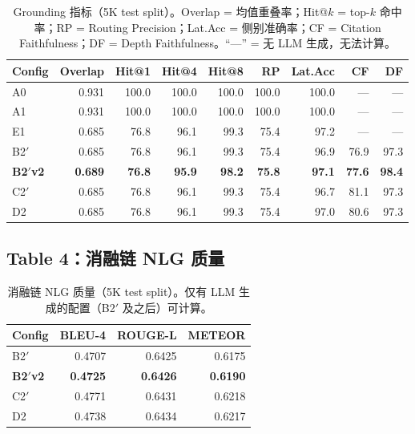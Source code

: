 \documentclass[11pt,a4paper]{article}
\theoremstyle{definition}
\begin{document}
\begin{table}[H]
\centering
\caption{Grounding 指标（5K test split）。Overlap = 均值重叠率；Hit@$k$ = top-$k$ 命中率；RP = Routing Precision；Lat.Acc = 侧别准确率；CF = Citation Faithfulness；DF = Depth Faithfulness。``---'' = 无 LLM 生成，无法计算。}\label{tab:grounding}
\small
\begin{tabular}{@{}l r r r r r r r r@{}}
\toprule
\textbf{Config} & \textbf{Overlap} & \textbf{Hit@1} & \textbf{Hit@4} & \textbf{Hit@8} & \textbf{RP} & \textbf{Lat.Acc} & \textbf{CF} & \textbf{DF} \\
\midrule
A0     & 0.931 & 100.0 & 100.0 & 100.0 & 100.0 & 100.0 & ---  & ---  \\
A1     & 0.931 & 100.0 & 100.0 & 100.0 & 100.0 & 100.0 & ---  & ---  \\
E1     & 0.685 &  76.8 &  96.1 &  99.3 &  75.4 &  97.2 & ---  & ---  \\
B2$'$  & 0.685 &  76.8 &  96.1 &  99.3 &  75.4 &  96.9 & 76.9 & 97.3 \\
\textbf{B2$'$v2} & \textbf{0.689} & \textbf{76.8} & \textbf{95.9} & \textbf{98.2} & \textbf{75.8} & \textbf{97.1} & \textbf{77.6} & \textbf{98.4} \\
C2$'$  & 0.685 &  76.8 &  96.1 &  99.3 &  75.4 &  96.7 & 81.1 & 97.3 \\
D2     & 0.685 &  76.8 &  96.1 &  99.3 &  75.4 &  97.0 & 80.6 & 97.3 \\
\bottomrule
\end{tabular}
\end{table}

\subsection{Table 4：消融链 NLG 质量}

\begin{table}[H]
\centering
\caption{消融链 NLG 质量（5K test split）。仅有 LLM 生成的配置（B2$'$ 及之后）可计算。}\label{tab:nlg}
\small
\begin{tabular}{@{}l r r r@{}}
\toprule
\textbf{Config} & \textbf{BLEU-4} & \textbf{ROUGE-L} & \textbf{METEOR} \\
\midrule
B2$'$            & 0.4707 & 0.6425 & 0.6175 \\
\textbf{B2$'$v2} & \textbf{0.4725} & \textbf{0.6426} & \textbf{0.6190} \\
C2$'$            & 0.4771 & 0.6431 & 0.6218 \\
D2               & 0.4738 & 0.6434 & 0.6217 \\
\bottomrule
\end{tabular}
\end{table}
\end{document}
